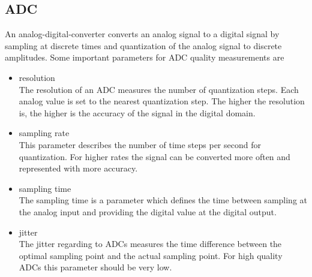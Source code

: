 \documentclass[11pt]{report}
\begin{document}
\subsection{ADC}
An analog-digital-converter converts an analog signal to a digital signal by sampling at discrete times and quantization of the analog signal to discrete amplitudes. Some important parameters for ADC quality measurements are
\begin{itemize}
\item resolution\\
The resolution of an ADC measures the number of quantization steps. Each analog value is set to the nearest quantization step. The higher the resolution is, the higher is the accuracy of the signal in the digital domain.
\item sampling rate\\
This parameter describes the number of time steps per second for quantization. For higher rates the signal can be converted more often and represented with more accuracy.
\item sampling time\\
The sampling time is a parameter which defines the time between sampling at the analog input and providing the digital value at the digital output.
\item jitter\\
The jitter regarding to ADCs measures the time difference between the optimal sampling point and the actual sampling point. For high quality ADCs this parameter should be very low.
\end{itemize}
\end{document}
